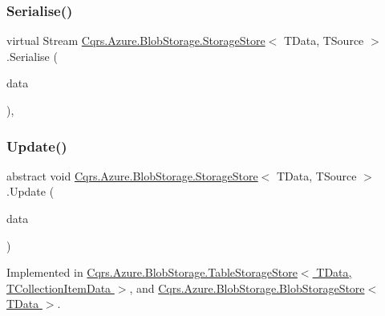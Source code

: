 \mbox{\label{classCqrs_1_1Azure_1_1BlobStorage_1_1StorageStore_a8e5d4e50e054d963f96aaa4808794718}} 
\subsubsection{\texorpdfstring{Serialise()}{Serialise()}}
{\footnotesize\ttfamily virtual Stream \hyperlink{classCqrs_1_1Azure_1_1BlobStorage_1_1StorageStore}{Cqrs.\+Azure.\+Blob\+Storage.\+Storage\+Store}$<$ T\+Data, T\+Source $>$.Serialise (\begin{DoxyParamCaption}\item[{T\+Data}]{data }\end{DoxyParamCaption})\hspace{0.3cm}{\ttfamily [protected]}, {\ttfamily [virtual]}}

\mbox{\label{classCqrs_1_1Azure_1_1BlobStorage_1_1StorageStore_ae9ca8bfe30040f77e349a4d47b31da70}} 
\subsubsection{\texorpdfstring{Update()}{Update()}}
{\footnotesize\ttfamily abstract void \hyperlink{classCqrs_1_1Azure_1_1BlobStorage_1_1StorageStore}{Cqrs.\+Azure.\+Blob\+Storage.\+Storage\+Store}$<$ T\+Data, T\+Source $>$.Update (\begin{DoxyParamCaption}\item[{T\+Data}]{data }\end{DoxyParamCaption})\hspace{0.3cm}{\ttfamily [pure virtual]}}



Implemented in \hyperlink{classCqrs_1_1Azure_1_1BlobStorage_1_1TableStorageStore_a869eba77358b10fc298f8e13fb21d628}{Cqrs.\+Azure.\+Blob\+Storage.\+Table\+Storage\+Store$<$ T\+Data, T\+Collection\+Item\+Data $>$}, and \hyperlink{classCqrs_1_1Azure_1_1BlobStorage_1_1BlobStorageStore_a03be976aded454866b4589de99a9e1c8}{Cqrs.\+Azure.\+Blob\+Storage.\+Blob\+Storage\+Store$<$ T\+Data $>$}.



